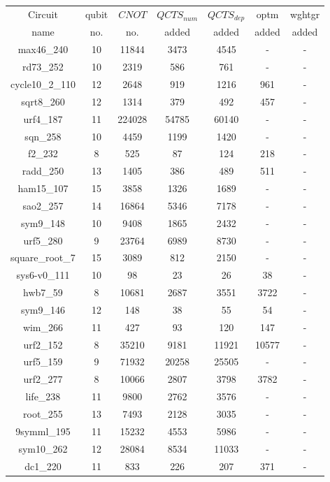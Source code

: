 \documentclass[runningheads]{llncs}
\begin{document}
		\begin{table}[H]
			\label{tab4}
			\begin{center}  
			\begin{tabular}{|c|c|c|c|c|c|c|}
			\hline
			Circuit &  qubit  & $CNOT$ &$QCTS_{num}$& $QCTS_{dep}$  & optm 	 & wghtgr 	\\
			 name	&   no. 	&	no. & added&  added &  added 	&  added\\
			\hline
			max46\_240 & 10 & 11844 & 3473 & 4545 & - & - \\ 
rd73\_252 & 10 & 2319 & 586 & 761 & - & - \\ 
cycle10\_2\_110 & 12 & 2648 & 919 & 1216 & 961 & - \\ 
sqrt8\_260 & 12 & 1314 & 379 & 492 & 457 & - \\ 
urf4\_187 & 11 & 224028 & 54785 & 60140 & - & - \\ 
sqn\_258 & 10 & 4459 & 1199 & 1420 & - & - \\ 
f2\_232 & 8 & 525 & 87 & 124 & 218 & - \\ 
radd\_250 & 13 & 1405 & 386 & 489 & 511 & - \\ 
ham15\_107 & 15 & 3858 & 1326 & 1689 & - & - \\ 
sao2\_257 & 14 & 16864 & 5346 & 7178 & - & - \\ 
sym9\_148 & 10 & 9408 & 1865 & 2432 & - & - \\ 
urf5\_280 & 9 & 23764 & 6989 & 8730 & - & - \\ 
square\_root\_7 & 15 & 3089 & 812 & 2150 & - & - \\ 
sys6-v0\_111 & 10 & 98 & 23 & 26 & 38 & - \\ 
hwb7\_59 & 8 & 10681 & 2687 & 3551 & 3722 & - \\ 
sym9\_146 & 12 & 148 & 38 & 55 & 54 & - \\ 
wim\_266 & 11 & 427 & 93 & 120 & 147 & - \\ 
urf2\_152 & 8 & 35210 & 9181 & 11921 & 10577 & - \\ 
urf5\_159 & 9 & 71932 & 20258 & 25505 & - & - \\ 
urf2\_277 & 8 & 10066 & 2807 & 3798 & 3782 & - \\ 
life\_238 & 11 & 9800 & 2762 & 3576 & - & - \\ 
root\_255 & 13 & 7493 & 2128 & 3035 & - & - \\ 
9symml\_195 & 11 & 15232 & 4553 & 5986 & - & - \\ 
sym10\_262 & 12 & 28084 & 8534 & 11033 & - & - \\ 
dc1\_220 & 11 & 833 & 226 & 207 & 371 & - \\ 

\end{tabular}
\end{center}
\end{table}
\end{document}
